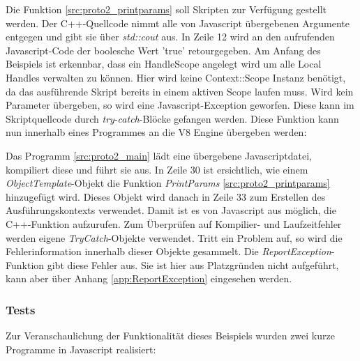 

Die Funktion \ref{src:proto2_printparams} soll Skripten zur Verfügung gestellt werden. 
Der C++-Quellcode nimmt alle von Javascript übergebenen Argumente entgegen und gibt sie über \textit{std::cout} aus. In Zeile 12 wird an den aufrufenden
Javascript-Code der boolesche Wert 'true' retourgegeben. 
Am Anfang des Beispiels ist erkennbar, dass ein HandleScope angelegt wird um alle Local Handles verwalten zu können. Hier wird keine Context::Scope
Instanz benötigt, da das ausführende Skript bereits in einem aktiven Scope laufen muss. Wird kein Parameter übergeben, so wird eine Javascript-Exception
geworfen. Diese kann im Skriptquellcode durch \textit{try}-\textit{catch}-Blöcke gefangen werden. Diese Funktion kann nun innerhalb eines Programmes
an die V8 Engine übergeben werden:



Das Programm \ref{src:proto2_main} lädt eine übergebene Javascriptdatei, kompiliert diese und führt sie aus. In Zeile 30 ist ersichtlich, wie einem
\textit{ObjectTemplate}-Objekt die Funktion \textit{PrintParams} \ref{src:proto2_printparams} hinzugefügt wird. Dieses Objekt wird danach in Zeile 33 
zum Erstellen des Ausführungskontexts verwendet. Damit ist es von Javascript aus möglich, die C++-Funktion aufzurufen. Zum Überprüfen auf Kompilier- und 
Laufzeitfehler werden eigene \textit{TryCatch}-Objekte verwendet. Tritt ein Problem auf, so wird die Fehlerinformation innerhalb dieser Objekte gesammelt.
Die \textit{ReportException}-Funktion gibt diese Fehler aus. Sie ist hier aus Platzgründen nicht aufgeführt, kann aber über Anhang \ref{app:ReportException} eingesehen werden.

\subsubsection{Tests}

Zur Veranschaulichung der Funktionalität dieses Beispiels wurden zwei kurze Programme in Javascript realisiert:



